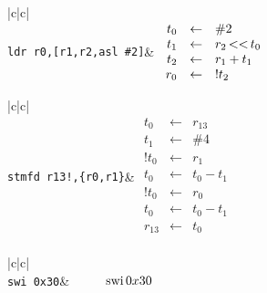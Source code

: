 \vspace{0.3cm}

{\centering \begin{tabular}{|c|c|}
\hline 
{}\\
\hline 
\hline 
{\tt ldr r0,[r1,r2,asl \#2]}&
\( \begin{array}{rcl}
t_0 & \leftarrow & \#2\\
t_1 & \leftarrow & r_2 \mathop{\rm <<} t_0\\
t_2 & \leftarrow & r_1 + t_1\\
r_0 & \leftarrow & !t_2\\
\end{array} \)\\
\hline 
\end{tabular}\par}

\vspace{0.3cm}

{\centering \begin{tabular}{|c|c|}
\hline 
{}\\
\hline 
\hline 
{\tt stmfd r13!,\{r0,r1\}}&
\( \begin{array}{rcl}
t_0 & \leftarrow & r_{13}\\
t_1 & \leftarrow & \#4\\
!t_0 & \leftarrow & r_1\\
t_0 & \leftarrow & t_0 - t_1\\
!t_0 & \leftarrow & r_0\\
t_0 & \leftarrow & t_0 - t_1\\
r_{13} & \leftarrow & t_0\\
\end{array} \)\\
\hline 
\end{tabular}\par}

\vspace{0.3cm}

{\centering \begin{tabular}{|c|c|}
\hline 
{}\\
\hline 
\hline 
{\tt swi 0x30}&
\( \begin{array}{rcl}
 & & \mathop{\rm swi} 0x30\\
\end{array} \)\\
\hline 
\end{tabular}\par}

